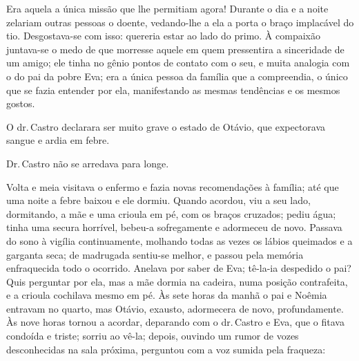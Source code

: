 {

Era aquela a única missão que lhe permitiam agora! Durante o dia
e a noite zelariam outras pessoas o doente, vedando-lhe a ela a porta o
braço implacável do tio. Desgostava-se com isso: quereria estar ao lado
do primo. À compaixão juntava-se o medo de que morresse aquele em quem
pressentira a sinceridade de um amigo; ele tinha no
gênio pontos de contato com o seu, e muita analogia com o do pai
da pobre Eva; era a única pessoa da família que a
compreendia, o único que se fazia entender por ela,
manifestando as mesmas tendências e os mesmos gostos.

O dr.\,Castro declarara ser muito grave o estado de Otávio, que
expectorava sangue e ardia em febre.


Dr.\,Castro não se arredava para longe.

Volta e meia visitava o enfermo e fazia novas recomendações à
família; até que uma noite a febre baixou e ele dormiu. Quando
acordou, viu a seu lado, dormitando, a mãe e uma
crioula em pé, com os braços cruzados; pediu água; tinha uma secura
horrível, bebeu-a sofregamente e adormeceu de novo. Passava do sono à
vigília continuamente, molhando todas as vezes os lábios
queimados e a garganta seca; de madrugada sentiu-se melhor, e passou
pela memória enfraquecida todo o ocorrido. Anelava por saber de
Eva; tê-la-ia despedido o pai? Quis perguntar por ela, mas a
mãe dormia na cadeira, numa posição contrafeita, e a crioula
cochilava mesmo em pé. Às sete horas da manhã o pai e Noêmia
entravam no quarto, mas Otávio, exausto, adormecera de novo,
profundamente. Às nove horas tornou a acordar, deparando com o dr.\,Castro e Eva, que o fitava condoída e triste; sorriu ao vê-la; depois,
ouvindo um rumor de vozes desconhecidas na sala próxima, perguntou com a
voz sumida pela fraqueza:

}
